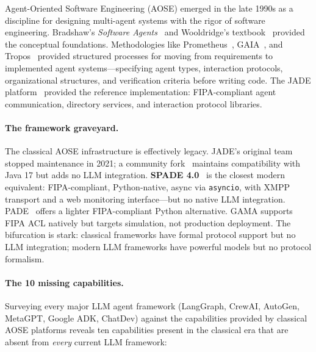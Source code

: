 \documentclass{article}
\begin{document}
Agent-Oriented Software Engineering (AOSE) emerged in the late 1990s as a discipline for
designing multi-agent systems with the rigor of software engineering.
Bradshaw's \emph{Software Agents}~\citep{sutra65_software1996} and Wooldridge's
textbook~\citep{sutra42_introduction2002} provided the conceptual foundations.
Methodologies like
Prometheus~\citep{padgham2004prometheus}, GAIA~\citep{wooldridge2000gaia}, and
Tropos~\citep{bresciani2004tropos, sutra18716_tropos2004} provided structured
processes for moving from requirements to implemented agent systems---specifying
agent types, interaction protocols,
organizational structures, and verification criteria before writing code. The JADE
platform~\citep{bellifemine2007jade} provided the reference implementation: FIPA-compliant
agent communication, directory services, and interaction protocol libraries.

\paragraph{The framework graveyard.}
The classical AOSE infrastructure is effectively legacy. JADE's original team stopped
maintenance in 2021; a community fork~\citep{jadeplatform} maintains compatibility with
Java 17 but adds no LLM integration. \textbf{SPADE 4.0}~\citep{palanca2020spade} is the
closest modern equivalent: FIPA-compliant, Python-native, async via \texttt{asyncio}, with
XMPP transport and a web monitoring interface---but no native LLM integration.
PADE~\citep{pade} offers a lighter FIPA-compliant Python alternative. GAMA supports FIPA
ACL natively but targets simulation, not production deployment. The bifurcation is stark:
classical frameworks have formal protocol support but no LLM integration; modern LLM
frameworks have powerful models but no protocol formalism.

\paragraph{The 10 missing capabilities.}
Surveying every major LLM agent framework (LangGraph, CrewAI, AutoGen, MetaGPT, Google
ADK, ChatDev) against the capabilities provided by classical AOSE platforms reveals ten
capabilities present in the classical era that are absent from \emph{every} current LLM
framework:
\end{document}
